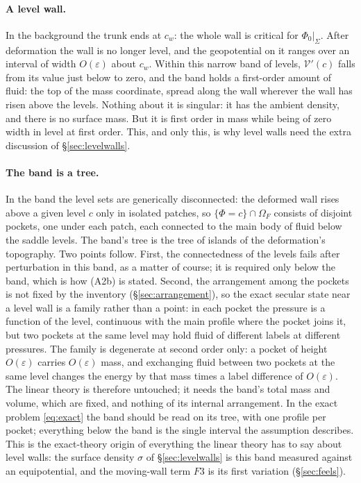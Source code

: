 \documentclass[11pt]{article}
\theoremstyle{definition}
\theoremstyle{remark}
\newcommand{\Vol}{\mathcal V}
\begin{document}
\paragraph{A level wall.} In the background the trunk ends at $c_w$:
the whole wall is critical for $\Phi_0|_\Sigma$. After deformation the
wall is no longer level, and the geopotential on it ranges over an
interval of width $O(\varepsilon)$ about $c_w$. Within this narrow band
of levels, $\Vol'(c)$ falls from its value just below to zero, and the
band holds a first-order amount of fluid: the top of the mass
coordinate, spread along the wall wherever the wall has risen above
the levels. Nothing about it is singular: it has the ambient density,
and there is no surface mass. But it is first order in mass while
being of zero width in level at first order. This, and only this, is
why level walls need the extra discussion of \S\ref{sec:levelwalls}.

\paragraph{The band is a tree.} In the band the level sets are
generically disconnected: the deformed wall rises above a given level
$c$ only in isolated patches, so $\{\Phi = c\}\cap\Omega_F$ consists of
disjoint pockets, one under each patch, each connected to the main
body of fluid below the saddle levels. The band's tree is the tree of
islands of the deformation's topography. Two points follow. First, the
connectedness of the levels fails after
perturbation in this band, as a matter of course; it is required only
below the band, which is how (A2b) is stated. Second, the
arrangement among the pockets is not fixed by the inventory
(\S\ref{sec:arrangement}), so the exact secular state near a level wall
is a family rather than a point: in each pocket the pressure is a
function of the level, continuous with the main profile where the
pocket joins it, but two pockets at the same level may hold fluid of
different labels at different pressures. The family is degenerate at
second order only: a pocket of height $O(\varepsilon)$ carries
$O(\varepsilon)$ mass, and exchanging fluid between two pockets at the
same level changes the energy by that mass times a label difference of
$O(\varepsilon)$. The linear theory is therefore untouched; it needs the
band's total mass and volume, which are fixed, and nothing of its
internal arrangement. In the exact problem \eqref{eq:exact} the band
should be read on its tree, with one profile per pocket; everything
below the band is the single interval the assumption describes. This
is the exact-theory origin of everything the linear theory has to say
about level walls: the surface density $\sigma$ of \S\ref{sec:levelwalls}
is this band measured against an equipotential, and the moving-wall
term $F3$ is its first variation (\S\ref{sec:feels}).
\end{document}
